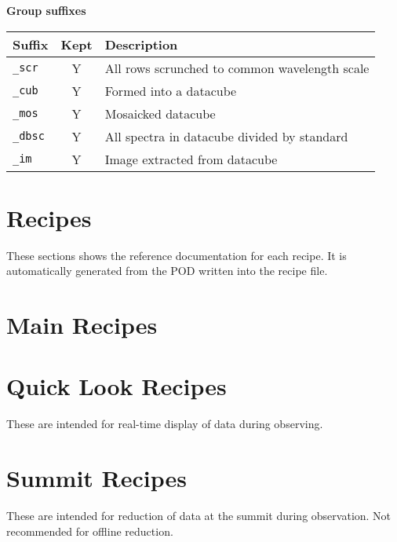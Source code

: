 \documentclass[twoside,11pt,nolof]{starlink}
\begin{document}
\vspace{0.5cm}

\textbf{Group suffixes}

\vspace{0.2cm}

\begin{tabular}{l c l}
\hline
Suffix & Kept & Description \hspace{9cm} \\
\hline
\texttt{\_scr} & Y & All rows scrunched to common wavelength scale\\
\texttt{\_cub} & Y & Formed into a datacube\\
\texttt{\_mos} & Y & Mosaicked datacube\\
\texttt{\_dbsc} & Y & All spectra in datacube divided by standard\\
\texttt{\_im}  & Y & Image extracted from datacube\\
\hline
\end{tabular}



\appendix

\section{Recipes}
These sections shows the reference documentation for each recipe. It is
automatically generated from the POD written into the recipe file.

\section{Main Recipes}


\section{Quick Look Recipes}
These are intended for real-time display of data during observing.


\section{Summit Recipes}
These are intended for reduction of data at the summit during
observation. Not recommended for offline reduction.

\end{document}

